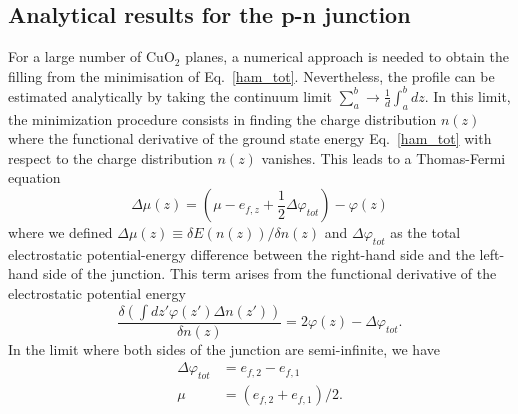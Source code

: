 \documentclass[twocolumn, preprintnumbers,prb,aps,amssymb,showpacs]{revtex4}
\begin{document}


\subsection{Analytical results for the p-n junction}

For a large number of CuO$_{2}$ planes, a numerical approach is needed to obtain the filling from the minimisation of Eq.~\eqref{ham_tot}. Nevertheless, the
profile can be estimated analytically by taking the continuum limit $\sum_a^b \rightarrow \frac{1}{d}\int_a^b dz$. In
this limit, the minimization procedure consists in finding the charge
distribution $n\left( z\right)$ where the functional derivative
of the ground state energy Eq.~\eqref{ham_tot} with respect to the charge distribution $n\left(z\right)$ vanishes. This leads to a Thomas-Fermi equation 
\begin{equation}
\Delta\mu\left( z\right) =\left( \mu - e_{f,z} + \frac{1}{2}\Delta\varphi_{tot}\right) - \varphi\left(z\right)  \label{delta_mu1}
\end{equation}%
where we defined $\Delta\mu\left( z\right) \equiv \delta E\left(n(z)\right)/\delta n(z)$ and $\Delta\varphi_{tot}$ as the total electrostatic potential-energy difference between the right-hand side and the left-hand side of the junction. This term arises from the functional derivative of the electrostatic potential energy
\begin{equation}
\frac{\delta \left( \int dz'\varphi(z')\Delta n(z')\right)}{\delta n(z)}=2\varphi (z) - \Delta\varphi_{tot}.
\end{equation} 
In the limit where both sides of the junction are semi-infinite, we have
\begin{align}
\Delta\varphi_{tot}  &  =e_{f,2}-e_{f,1}\\
\mu &  =\left(  e_{f,2}+e_{f,1}\right)  /2. 
\end{align}
\end{document}
